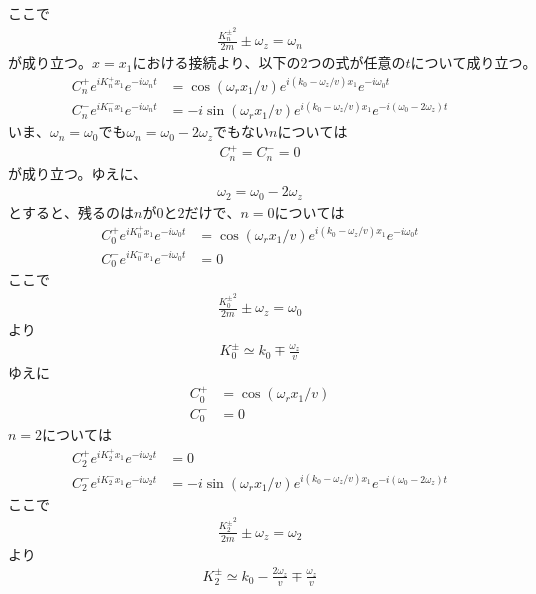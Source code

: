 ここで
\begin{align}
\frac{{K_{n}^{\pm}}^2}{2m}{\pm}\omega_{z}=\omega_{n}
\end{align}
$が成り立つ。x=x_{1}における接続より、以下の2つの式が任意のtについて成り立つ。$
\begin{align}
C_{n}^{+}e^{iK_{n}^{+}x_{1}}e^{-i\omega_{n}t}&=\cos({{\omega_{r}}x_{1}/v})e^{i(k_{0}-\omega_{z}/v)x_{1}}e^{-i\omega_{0}t} \\
C_{n}^{-}e^{iK_{n}^{-}x_{1}}e^{-i\omega_{n}t}&=-i\sin({{\omega_{r}}x_{1}/v})e^{i(k_{0}-\omega_{z}/v)x_{1}}e^{-i(\omega_{0}-2\omega_{z})t}
\end{align}
$いま、\omega_{n}=\omega_{0}でも\omega_{n}=\omega_{0}-2\omega_{z}でもないnについては$
\begin{align}
C_{n}^{+}=C_{n}^{-}=0
\end{align}
が成り立つ。ゆえに、
\begin{align}
\omega_{2}=\omega_{0}-2\omega_{z}
\end{align}
$とすると、残るのはnが0と2だけで、n=0については$
\begin{align}
C_{0}^{+}e^{iK_{0}^{+}x_{1}}e^{-i\omega_{0}t}&=\cos({{\omega_{r}}x_{1}/v})e^{i(k_{0}-\omega_{z}/v)x_{1}}e^{-i\omega_{0}t} \\
C_{0}^{-}e^{iK_{0}^{-}x_{1}}e^{-i\omega_{0}t}&=0
\end{align}
ここで
\begin{align}
\frac{{K_{0}^{\pm}}^2}{2m}{\pm}\omega_{z}=\omega_{0}
\end{align}
より
\begin{align}
K_{0}^{\pm}{\simeq}k_{0}{\mp}\frac{\omega_{z}}{v}
\end{align}
ゆえに
\begin{align}
C_{0}^{+}&=\cos({{\omega_{r}}x_{1}/v}) \\
C_{0}^{-}&=0
\end{align}
$n=2については$
\begin{align}
C_{2}^{+}e^{iK_{2}^{+}x_{1}}e^{-i\omega_{2}t}&=0 \\
C_{2}^{-}e^{iK_{2}^{-}x_{1}}e^{-i\omega_{2}t}&=-i\sin({{\omega_{r}}x_{1}/v})e^{i(k_{0}-\omega_{z}/v)x_{1}}e^{-i(\omega_{0}-2\omega_{z})t}
\end{align}
ここで
\begin{align}
\frac{{K_{2}^{\pm}}^2}{2m}{\pm}\omega_{z}=\omega_{2}
\end{align}
より
\begin{align}
K_{2}^{\pm}{\simeq}k_{0}-\frac{2\omega_{z}}{v}{\mp}\frac{\omega_{z}}{v}
\end{align}
